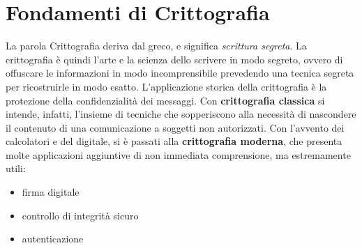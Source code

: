 \section{Fondamenti di Crittografia}
La parola Crittografia deriva dal greco, e significa \textit{scrittura segreta}. La crittografia è quindi l'arte e la scienza dello scrivere in modo segreto, ovvero di offuscare le informazioni in modo incomprensibile prevedendo una tecnica segreta per ricostruirle in modo esatto. L'applicazione storica della crittografia è la protezione della confidenzialità dei messaggi. Con \textbf{crittografia classica} si intende, infatti, l'insieme di tecniche che sopperiscono alla necessità di nascondere il contenuto di una comunicazione a soggetti non autorizzati. Con l'avvento dei calcolatori e del digitale, si è passati alla \textbf{crittografia moderna}, che presenta molte applicazioni aggiuntive di non immediata comprensione, ma estremamente utili:
\begin{itemize} 
  \item firma digitale
  \item controllo di integrità sicuro
  \item autenticazione
\end{itemize}


